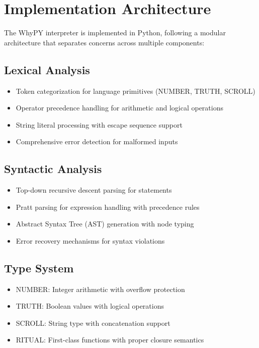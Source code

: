 \documentclass[11pt]{article}
\newenvironment{feature}
{\begin{tcolorbox}[
    colback=lightgray,
    colframe=primary,
    arc=0mm,
    boxrule=1pt
]}
{\end{tcolorbox}}
\begin{document}
\section{Implementation Architecture}
\begin{feature}
The WhyPY interpreter is implemented in Python, following a modular architecture that separates concerns across multiple components:

\subsection*{Lexical Analysis}
\begin{itemize}[label=\textcolor{primary}{\faCode}]
    \item Token categorization for language primitives (NUMBER, TRUTH, SCROLL)
    \item Operator precedence handling for arithmetic and logical operations
    \item String literal processing with escape sequence support
    \item Comprehensive error detection for malformed inputs
\end{itemize}

\subsection*{Syntactic Analysis}
\begin{itemize}[label=\textcolor{primary}{\faCode}]
    \item Top-down recursive descent parsing for statements
    \item Pratt parsing for expression handling with precedence rules
    \item Abstract Syntax Tree (AST) generation with node typing
    \item Error recovery mechanisms for syntax violations
\end{itemize}

\subsection*{Type System}
\begin{itemize}[label=\textcolor{primary}{\faCode}]
    \item NUMBER: Integer arithmetic with overflow protection
    \item TRUTH: Boolean values with logical operations
    \item SCROLL: String type with concatenation support
    \item RITUAL: First-class functions with proper closure semantics
\end{itemize}
\end{feature}
\end{document}
